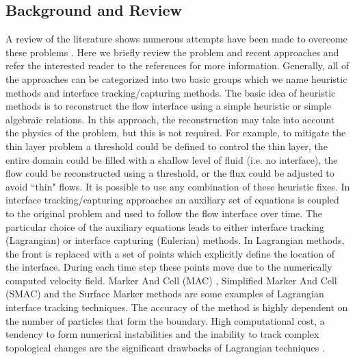 \documentclass[review]{elsarticle}
\begin{document}
\subsection{Background and Review}
A review of the literature shows numerous attempts have been made to overcome these problems \cite{Medeiros2013,Balzano1998,Aureli2008,Bunya2009,Casulli2009,
Kesserwani2011,DAlpaos2007,Castro2005}.
Here we briefly review the problem and recent approaches and refer the interested reader to the references for more information.
Generally, all of the approaches can be 
categorized into two basic groups which we name heuristic methods and interface tracking/capturing methods.
The basic idea of heuristic methods  \cite{Aureli2008,Bunya2009,Castro2005,Kesserwani2011} is to reconstruct the flow interface using a
simple heuristic or simple algebraic relations. In this approach, the reconstruction may take into account the physics of the problem, but this is not required. 
For example, to mitigate the thin layer problem a threshold could be defined to control the thin layer, the entire domain could be filled with a shallow level of fluid (i.e. no interface),
the flow could be reconstructed using a threshold, or the flux could be adjusted to avoid ``thin" flows. It is possible to use any combination of these heuristic fixes.
In interface tracking/capturing approaches
an auxiliary set of equations is coupled to the original problem and used to follow the flow interface over time. 
The particular choice of the auxiliary equations leads to either interface tracking (Lagrangian) or interface capturing (Eulerian) methods.
In Lagrangian methods, the front is replaced with a set of  points   which explicitly define the location of the interface.
During each time step these points move due to the numerically computed velocity field.
Marker And Cell (MAC) \cite{Harlow1965}, Simplified Marker And Cell (SMAC) \cite{Cheng1995} and the Surface Marker \citep{Wrobel1991} methods are some examples of Lagrangian interface tracking techniques.
The accuracy of the method is highly dependent on the number of particles that form the boundary.
High computational cost, a tendency to form numerical instabilities and the inability to track complex topological changes are the significant drawbacks of Lagrangian techniques
 \cite{Glimm1995,Unverdi1992,Osher1988,Anderson1998,hirt1981vfv}.
\end{document}
